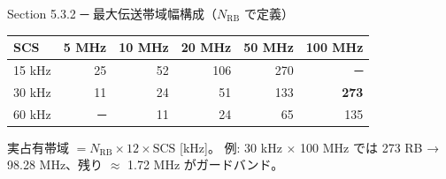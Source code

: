 \begin{frame}{Section 5.3.2 ─ 最大伝送帯域幅構成（$N_{\mathrm{RB}}$ で定義）}
\centering
\begin{tabular}{lrrrrr}
\toprule
SCS & 5 MHz & 10 MHz & 20 MHz & 50 MHz & 100 MHz \\
\midrule
15 kHz & 25 & 52 & 106 & 270 & ─ \\
30 kHz & 11 & 24 & 51  & 133 & \textbf{273} \\
60 kHz & ─  & 11 & 24  & 65  & 135 \\
\bottomrule
\end{tabular}

\vspace{0.6em}
{\small 実占有帯域 $= N_{\mathrm{RB}} \times 12 \times \mathrm{SCS}$ [kHz]。
例: 30 kHz $\times$ 100 MHz では 273 RB → 98.28 MHz、残り $\approx$ 1.72 MHz がガードバンド。}
\end{frame}
